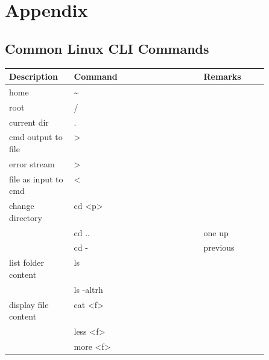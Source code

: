 \section{Appendix}
\subsection{Common Linux CLI Commands}
\renewcommand{\arraystretch}{1.1}
\setlength\tabcolsep{3pt} %
{\small %
    \begin{tabularx}{\linewidth}{@{} p{0.25\linewidth}>{\ttfamily}lp{0.25\linewidth} @{}}
        \toprule
        Description          & \normalfont Command        & Remarks                          \\
        \midrule
        home                 & \textasciitilde{}          &                                  \\
        root                 & /                          &                                  \\
        current dir          & .                          &                                  \\
        cmd output to file   & >                          &                                  \\
        error stream         & 2>                         &                                  \\
        file as input to cmd & <                          &                                  \\
        change directory     & cd <p>                     &                                  \\
                             & cd ..                      & one up                           \\
                             & cd -                       & previous                         \\
        list folder content  & ls                         &                                  \\
                             & ls -altrh                  &                                  \\
        display file content & cat <f>                    &                                  \\
                             & less <f>                   &                                  \\
                             & more <f>                   &                                  \\

\end{tabularx}}
